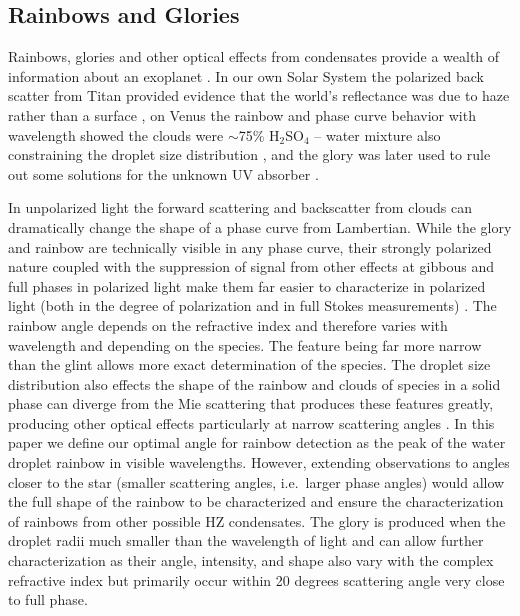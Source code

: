 \documentclass[
    usenatbib,
]{mnras}
\begin{document}
\subsection{Rainbows and Glories}

Rainbows, glories and other optical effects from condensates provide a wealth of information about an exoplanet \citep{karalidi2012rainbow, stam2008}.
%
In our own Solar System the polarized back scatter from Titan provided evidence that the world's reflectance was due to haze rather than a surface \citep{zellner1973polarization}, on Venus the rainbow and phase curve behavior with wavelength showed the clouds were $\sim$75\% H$_2$SO$_4$ -- water mixture also constraining the droplet size distribution \citep{hansenhovenier1974}, and the glory was later used to rule out some solutions for the unknown UV absorber \citep{petrova2018glory}.

In unpolarized light the forward scattering and backscatter from clouds can dramatically change the shape of a phase curve from Lambertian.
%
While the glory and rainbow are technically visible in any phase curve, their strongly polarized nature coupled with the suppression of signal from other effects at gibbous and full phases in polarized light make them far easier to characterize in polarized light (both in the degree of polarization and in full Stokes measurements) \citep{karalidi2011, stam2008, treesandstam2019}.
%
The rainbow angle depends on the refractive index and therefore varies with wavelength and depending on the species.
%
The feature being far more narrow than the glint allows more exact determination of the species.
%
The droplet size distribution also effects the shape of the rainbow and clouds of species in a solid phase can diverge from the Mie scattering that produces these features greatly, producing other optical effects particularly at narrow scattering angles \citep{bailey2007, hansentravis1974, Karalidi2012ice}.
%
In this paper we define our optimal angle for rainbow detection as the peak of the water droplet rainbow in visible wavelengths.
%
However, extending observations to angles closer to the star (smaller scattering angles, i.e.\ larger phase angles) would allow the full shape of the rainbow to be characterized and ensure the characterization of rainbows from other possible HZ condensates.
%
The glory is produced when the droplet radii much smaller than the wavelength of light and can allow further characterization as their angle, intensity, and shape also vary with the complex refractive index but primarily occur within 20 degrees scattering angle very close to full phase. 
%
\end{document}
